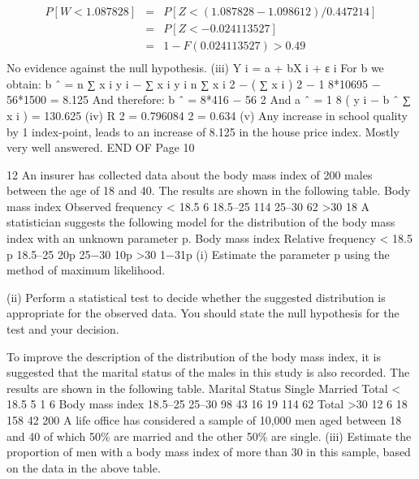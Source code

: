 \documentclass[a4paper,12pt]{article}
\begin{document}
\begin{enumerate}
\begin{eqnarray*}
P [ W < 1.087828 ] &=& P [ Z < ( 1.087828 − 1.098612) / 0.447214]\\
&=& P [ Z < − 0.024113527 ] \\ &=& 1 − F (0.024113527) > 0.49\\
\end{eqnarray*}
No evidence against the null hypothesis.
(iii)
Y i = a + bX i + ε i
{
For b we obtain: b ˆ = n ∑ x i y i −
∑ x i \sum y i } { n ∑ x i 2 − ( ∑ x i ) 2 }
− 1
8*10695 − 56*1500
= 8.125
And therefore: b ˆ =
8*416 − 56 2
And a ˆ =
1
8
( \sum y i − b ˆ ∑ x i ) = 130.625
(iv) R 2 = 0.796084 2 = 0.634
(v) Any increase in school quality by 1 index-point, leads to an increase of 8.125
in the house price index.
Mostly very well answered.
END OF %
Page 10

12
An insurer has collected data about the body mass index of 200 males between the
age of 18 and 40. The results are shown in the following table.
Body mass index
Observed frequency
< 18.5
6
18.5–25
114
25–30
62
>30
18
A statistician suggests the following model for the distribution of the body mass index
with an unknown parameter p.
Body mass index
Relative frequency
< 18.5
p
18.5–25
20p
25−30
10p
>30
1−31p
(i) Estimate the parameter p using the method of maximum likelihood.

(ii) Perform a statistical test to decide whether the suggested distribution is
appropriate for the observed data. You should state the null hypothesis for the
test and your decision.

To improve the description of the distribution of the body mass index, it is suggested
that the marital status of the males in this study is also recorded. The results are
shown in the following table.
Marital Status
Single
Married
Total
< 18.5
5
1
6
Body mass index
18.5–25
25–30
98
43
16
19
114
62
Total
>30
12
6
18
158
42
200
A life office has considered a sample of 10,000 men aged between 18 and 40 of which 50\% are married and the other 50\% are single.
(iii) Estimate the proportion of men with a body mass index of more than 30 in this sample, based on the data in the above table.


\end{enumerate}
\end{document}
